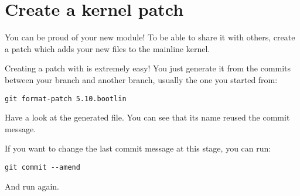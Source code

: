 \section{Create a kernel patch}

You can be proud of your new module! To be able to share it with
others, create a patch which adds your new files to the mainline
kernel.

Creating a patch with  is extremely easy! You just generate it
from the commits between your branch and another branch, usually the
one you started from:

\begin{verbatim}
git format-patch 5.10.bootlin
\end{verbatim}

Have a look at the generated file. You can see that its name reused
the commit message.

If you want to change the last commit message at this stage, you
can run:

\begin{verbatim}
git commit --amend
\end{verbatim}

And run  again.

